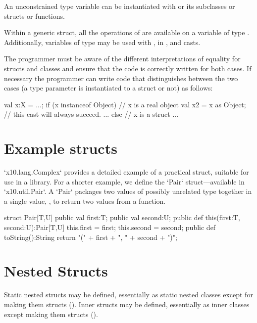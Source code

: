 An unconstrained type variable  can be instantiated with  or
its subclasses or structs or functions.

Within a generic struct, all the operations of  are available
on a variable of type . Additionally, variables of type  may
be used with \Xcd{==, !=}, in , and casts.

The programmer must be aware of the different interpretations of
equality for structs and classes and ensure that the code is correctly
written for both cases. If necessary the programmer can write code
that distinguishes between the two cases (a type parameter  is
instantiated to a struct or not) as follows:

\begin{xten}
val x:X = ...;
if (x instanceof Object) { // x is a real object
   val x2 = x as Object; // this cast will always succeed.
   ...
} else { // x is a struct
   ...
}
\end{xten}
 
  
\section{Example structs}

\xcd`x10.lang.Complex` provides a detailed example of a practical struct,
suitable for use in a library.  For a shorter example, we define the
\xcd`Pair` struct---available in \xcd`x10.util.Pair`.  A \xcd`Pair` packages
two values of possibly unrelated type together in a single value, \eg, to
return two values from a function.

\begin{xten}
struct Pair[T,U] {
    public val first:T;
    public val second:U;
    public def this(first:T, second:U):Pair[T,U] {
        this.first = first;
        this.second = second;
    }
    public def toString():String {
        return "(" + first + ", " + second + ")";
    }
}
\end{xten}
%

\section{Nested Structs}

Static nested structs may be defined, essentially as static nested classes
except for making them structs
().  Inner structs may be defined, essentially as
inner classes except making them structs ().
